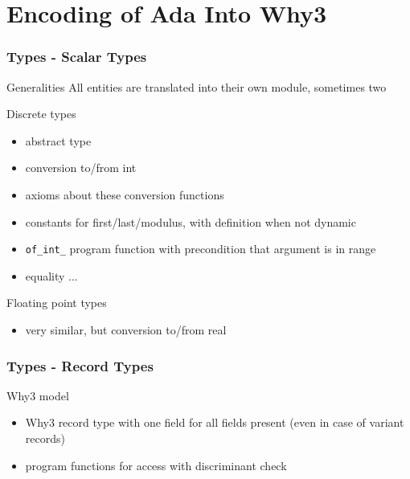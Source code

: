 \documentclass{beamer}
\newenvironment{specialframe}{%
  \begin{frame}[fragile,environment=specialframe]}{\end{frame}}
\begin{document}


\section{Encoding of Ada Into Why3}

\begin{specialframe}\frametitle{Types - Scalar Types}
   \begin{block}{Generalities}
      All entities are translated into their own module, sometimes two
   \end{block}

   \begin{block}{Discrete types}
   \begin{itemize}
      \item abstract type
      \item conversion to/from int
      \item axioms about these conversion functions
      \item constants for first/last/modulus, with definition when not dynamic
      \item \verb|of_int_| program function with precondition that argument is
         in range
      \item equality ...
   \end{itemize}
   \end{block}
   \vspace{-1em}
   \begin{block}{Floating point types}
      \begin{itemize}
         \item very similar, but conversion to/from real
      \end{itemize}
   \end{block}
\end{specialframe}

\begin{specialframe}\frametitle{Types - Record Types}
   \begin{block}{Why3 model}
      \begin{itemize}
         \item Why3 record type with one field for all fields present
               (even in case of variant records)
         \item program functions for access with discriminant check
      \end{itemize}
   \end{block}
\end{specialframe}
\end{document}
